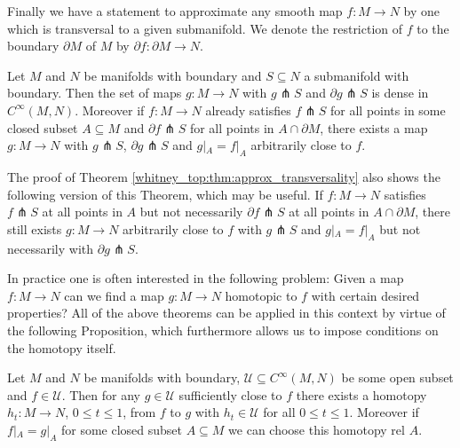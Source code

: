 Finally we have a statement to approximate any smooth map $f \colon M \to N$ by one which is transversal to a given submanifold. We denote the restriction of $f$ to the boundary $\partial M$ of $M$ by $\partial f \colon \partial M \to N$.

\begin{theorem}[Transversality]
    \label{whitney_top:thm:approx_transversality}
    Let $M$ and $N$ be manifolds with boundary and $S \subseteq N$ a submanifold with boundary. Then the set of maps $g \colon M \to N$ with $g \pitchfork S$ and $\partial g \pitchfork S$ is dense in $C^\infty(M,N)$. Moreover if $f \colon M \to N$ already satisfies $f \pitchfork S$ for all points in some closed subset $A \subseteq M$ and $\partial f \pitchfork S$ for all points in $A \cap \partial M$, there exists a map $g \colon M \to N$ with $g \pitchfork S$, $\partial g \pitchfork S$ and $g|_A = f|_A$ arbitrarily close to $f$.
\end{theorem}

\begin{remark}
    The proof of Theorem \ref{whitney_top:thm:approx_transversality} also shows the following version of this Theorem, which may be useful. If $f \colon M \to N$ satisfies $f \pitchfork S$ at all points in $A$ but not necessarily $\partial f \pitchfork S$ at all points in $A \cap \partial M$, there still exists $g \colon M \to N$ arbitrarily close to $f$ with $g \pitchfork S$ and $g|_A = f|_A$ but not necessarily with $\partial g \pitchfork S$.
\end{remark}

In practice one is often interested in the following problem: Given a map $f \colon M \to N$ can we find a map $g \colon M \to N$ homotopic to $f$ with certain desired properties? All of the above theorems can be applied in this context by virtue of the following Proposition, which furthermore allows us to impose conditions on the homotopy itself.

\begin{proposition}
    \label{whitney_top:prop:homotopy_construction}
    Let $M$ and $N$ be manifolds with boundary, $\mathcal{U} \subseteq  C^\infty(M,N)$ be some open subset and $f \in \mathcal{U}$. Then for any $g \in \mathcal{U}$ sufficiently close to $f$ there exists a homotopy $h_t \colon M \to N$, $0 \leq t \leq 1$, from $f$ to $g$ with $h_t \in \mathcal{U}$ for all $0 \leq t \leq 1$. Moreover if $f|_A = g|_A$ for some closed subset $A \subseteq M$ we can choose this homotopy rel $A$.
\end{proposition}


